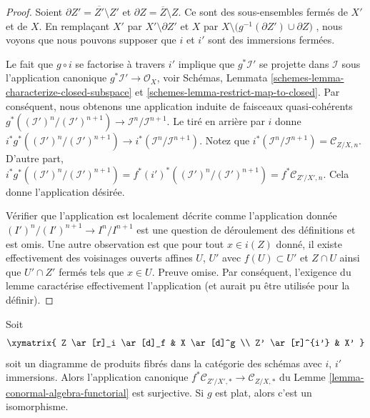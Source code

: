 \begin{proof}
Soient  $\partial Z' = \overline{Z'} \setminus Z'$  et  $\partial Z = \overline{Z} \setminus Z$. Ce sont des sous-ensembles fermés de
 $X'$  et de  $X$. En remplaçant  $X'$  par  $X' \setminus \partial Z'$  et
 $X$  par  $X \setminus \big(g^{-1}(\partial Z') \cup \partial Z\big)$ , nous voyons que nous pouvons supposer que
 $i$  et  $i'$  sont des immersions fermées.

\medskip\noindent
Le fait que  $g \circ i$  se factorise à travers  $i'$  implique que
 $g^*\mathcal{I}'$  se projette dans  $\mathcal{I}$  sous l'application canonique
 $g^*\mathcal{I}' \to \mathcal{O}_X$, voir Schémas, Lemmata  \ref{schemes-lemma-characterize-closed-subspace}  et  \ref{schemes-lemma-restrict-map-to-closed}. Par conséquent,
nous obtenons une application induite de faisceaux quasi-cohérents  $g^*((\mathcal{I}')^n/(\mathcal{I}')^{n + 1}) \to
\mathcal{I}^n/\mathcal{I}^{n + 1}$.
Le tiré en arrière par  $i$  donne  $i^*g^*((\mathcal{I}')^n/(\mathcal{I}')^{n + 1}) \to
i^*(\mathcal{I}^n/\mathcal{I}^{n + 1})$. Notez que  $i^*(\mathcal{I}^n/\mathcal{I}^{n + 1}) = \mathcal{C}_{Z/X, n}$.
D'autre part,  $i^*g^*((\mathcal{I}')^n/(\mathcal{I}')^{n + 1}) =
f^*(i')^*((\mathcal{I}')^n/(\mathcal{I}')^{n + 1}) =
f^*\mathcal{C}_{Z'/X', n}$. Cela donne l'application désirée.

\medskip\noindent
Vérifier que l'application est localement décrite comme l'application donnée
 $(I')^n/(I')^{n + 1} \to I^n/I^{n + 1}$  est une question de déroulement des définitions et est omis. Une
autre observation est que pour tout  $x \in i(Z)$  donné, il existe effectivement
des voisinages ouverts affines  $U$,  $U'$  avec  $f(U) \subset U'$  et
 $Z \cap U$  ainsi que  $U' \cap Z'$  fermés tels que  $x \in U$. Preuve omise.
Par conséquent, l'exigence du lemme caractérise effectivement l'application (et
aurait pu être utilisée pour la définir).
\end{proof}

\begin{lemma}
\label{lemma-conormal-algebra-functorial-flat}
Soit
$$
\xymatrix{
Z \ar[r]_i \ar[d]_f & X \ar[d]^g \\
Z' \ar[r]^{i'} & X'
}
$$
soit un diagramme de produits fibrés dans la catégorie des schémas avec
 $i$,  $i'$  immersions. Alors l'application canonique  $f^*\mathcal{C}_{Z'/X', *} \to \mathcal{C}_{Z/X, *}$ 
du Lemme  \ref{lemma-conormal-algebra-functorial}  est surjective. Si  $g$  est plat, alors c'est un
isomorphisme.
\end{lemma}

